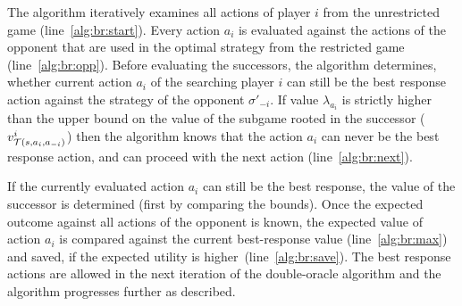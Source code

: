 The algorithm iteratively examines all actions of player $i$ from the unrestricted game (line~\ref{alg:br:start}).
Every action $a_i$ is evaluated against the actions of the opponent that are used in the optimal strategy from the restricted game (line~\ref{alg:br:opp}).
Before evaluating the successors, the algorithm determines, whether current action $a_i$ of the searching player $i$ can still be the best response action against the strategy of the opponent $\sigma'_{-i}$.
If value $\lambda_{a_i}$ is strictly higher than the upper bound on the value of the subgame rooted in the successor (\ie $v^i_{\mathcal{T}(s,a_i,a_{-i})}$) then the algorithm knows that the action $a_i$ can never be the best response action, and can proceed with the next action (line~\ref{alg:br:next}).
%

If the currently evaluated action $a_i$ can still be the best response, the value of the successor is determined (first by comparing the bounds). Once the expected outcome against all actions of the opponent is known, the expected value of action $a_i$ is compared against the current best-response value (line~\ref{alg:br:max}) and saved, if the expected utility is higher~(line~\ref{alg:br:save}). The best response actions are allowed in the next iteration of the double-oracle algorithm and the algorithm progresses further as described.


